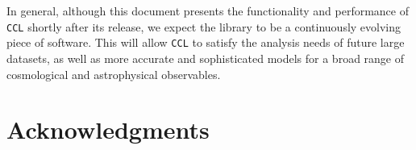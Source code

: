 \documentclass[\docopts]{\docclass}
\newcommand{\ccl}{{\tt CCL}\xspace}
\begin{document}
In general, although this document presents the functionality and performance of \ccl shortly after its release, we expect the library to be a continuously evolving piece of software. This will allow \ccl to satisfy the analysis needs of future large datasets, as well as more accurate and sophisticated models for a broad range of cosmological and astrophysical observables.

\section*{Acknowledgments}

\vskip 5pt


\vskip 5pt



\end{document}
